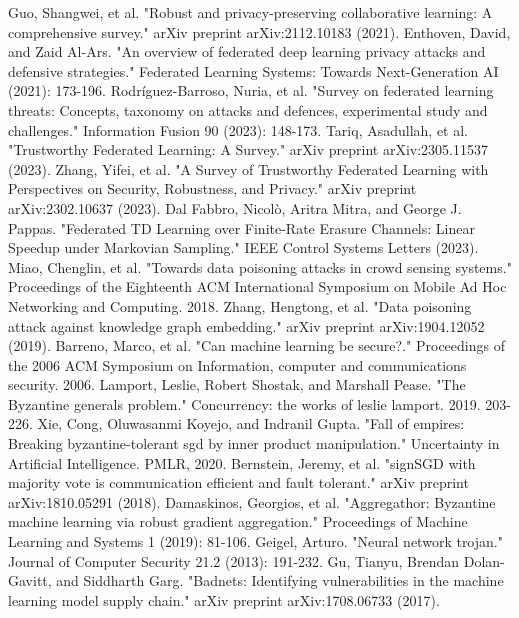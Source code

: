 \documentclass[conference]{IEEEtran}
\begin{document}
\begin{thebibliography}{00}
     Guo, Shangwei, et al. "Robust and privacy-preserving collaborative learning: A comprehensive survey." arXiv preprint arXiv:2112.10183 (2021).
     Enthoven, David, and Zaid Al-Ars. "An overview of federated deep learning privacy attacks and defensive strategies." Federated Learning Systems: Towards Next-Generation AI (2021): 173-196.
     Rodríguez-Barroso, Nuria, et al. "Survey on federated learning threats: Concepts, taxonomy on attacks and defences, experimental study and challenges." Information Fusion 90 (2023): 148-173.
     Tariq, Asadullah, et al. "Trustworthy Federated Learning: A Survey." arXiv preprint arXiv:2305.11537 (2023).
     Zhang, Yifei, et al. "A Survey of Trustworthy Federated Learning with Perspectives on Security, Robustness, and Privacy." arXiv preprint arXiv:2302.10637 (2023).
     Dal Fabbro, Nicolò, Aritra Mitra, and George J. Pappas. "Federated TD Learning over Finite-Rate Erasure Channels: Linear Speedup under Markovian Sampling." IEEE Control Systems Letters (2023).
     Miao, Chenglin, et al. "Towards data poisoning attacks in crowd sensing systems." Proceedings of the Eighteenth ACM International Symposium on Mobile Ad Hoc Networking and Computing. 2018.
     Zhang, Hengtong, et al. "Data poisoning attack against knowledge graph embedding." arXiv preprint arXiv:1904.12052 (2019).
     Barreno, Marco, et al. "Can machine learning be secure?." Proceedings of the 2006 ACM Symposium on Information, computer and communications security. 2006.
     Lamport, Leslie, Robert Shostak, and Marshall Pease. "The Byzantine generals problem." Concurrency: the works of leslie lamport. 2019. 203-226.
     Xie, Cong, Oluwasanmi Koyejo, and Indranil Gupta. "Fall of empires: Breaking byzantine-tolerant sgd by inner product manipulation." Uncertainty in Artificial Intelligence. PMLR, 2020.
     Bernstein, Jeremy, et al. "signSGD with majority vote is communication efficient and fault tolerant." arXiv preprint arXiv:1810.05291 (2018).
     Damaskinos, Georgios, et al. "Aggregathor: Byzantine machine learning via robust gradient aggregation." Proceedings of Machine Learning and Systems 1 (2019): 81-106.
     Geigel, Arturo. "Neural network trojan." Journal of Computer Security 21.2 (2013): 191-232.
     Gu, Tianyu, Brendan Dolan-Gavitt, and Siddharth Garg. "Badnets: Identifying vulnerabilities in the machine learning model supply chain." arXiv preprint arXiv:1708.06733 (2017).

\end{thebibliography}
\end{document}
